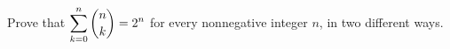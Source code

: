 Prove that $\displaystyle\sum_{k=0}^{n}\dbinom nk=2^n$ for every nonnegative integer $n$, in two different ways.
